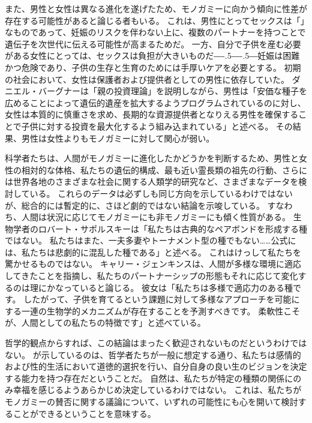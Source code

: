 \documentclass[paper=a4,book,openany]{jlreq}
\def\DDASH{―\kern-.5\zw―\kern-.5\zw―} %
\begin{document}
また、男性と女性は異なる進化を遂げたため、モノガミーに向かう傾向に性差が存在する可能性があると論じる者もいる。
これは、男性にとってセックスは「」なものであって、妊娠のリスクを伴わない上に、複数のパートナーを持つことで遺伝子を次世代に伝える可能性が高まるためだ。
一方、自分で子供を産む必要がある女性にとっては、セックスは負担が大きいものだ{\DDASH}妊娠は困難かつ危険であり、子供の生存と生育のためには手厚いケアを必要とする。
初期の社会において、女性は保護者および提供者としての男性に依存していた。
ダニエル・バーグナーは「親の投資理論」を説明しながら、男性は「安価な種子を広めることによって遺伝的遺産を拡大するようプログラムされているのに対し、女性は本質的に慎重さを求め、長期的な資源提供者となりえる男性を確保することで子供に対する投資を最大化するよう組み込まれている」と述べる\citep{bergner13:_unexc}。
その結果、男性は女性よりもモノガミーに対して関心が弱い。

科学者たちは、人間がモノガミーに進化したかどうかを判断するため、男性と女性の相対的な体格、私たちの遺伝的構成、最も近い霊長類の祖先の行動、さらには世界各地のさまざまな社会に関する人類学的研究など、さまざまなデータを検討している。
これらのデータは必ずしも同じ方向を示しているわけではないが、総合的には暫定的に、さほど劇的ではない結論を示唆している。
すなわち、人間は状況に応じてモノガミーにも非モノガミーにも傾く性質がある。
生物学者のロバート・サポルスキーは「私たちは古典的なペアボンドを形成する種ではない。
私たちはまた、一夫多妻やトーナメント型の種でもない……公式には、私たちは悲劇的に混乱した種である」と述べる\citep{sapolsky25:_biolog_human_behav}。
これはけっして私たちを驚かせるものではない。
キャリー・ジェンキンスは、人間が多様な環境に適応してきたことを指摘し、私たちのパートナーシップの形態もそれに応じて変化するのは理にかなっていると論じる。
彼女は「私たちは多様で適応力のある種です。
したがって、子供を育てるという課題に対して多様なアプローチを可能にする一連の生物学的メカニズムが存在することを予測すべきです。
柔軟性こそが、人間としての私たちの特徴です」と述べている\citep{dominus17:_is_open_marriag_happier_marriag}。

哲学的観点からすれば、この結論はまったく歓迎されないものだというわけではない。
が示しているのは、哲学者たちが一般に想定する通り、私たちは感情的および性的生活において道徳的選択を行い、自分自身の良い生のビジョンを決定する能力を持つ存在だということだ。
自然は、私たちが特定の種類の関係にのみ幸福を感じるようあらかじめ決定しているわけではない。
これは、私たちがモノガミーの賛否に関する議論について、いずれの可能性にも心を開いて検討することができるということを意味する。
\end{document}
